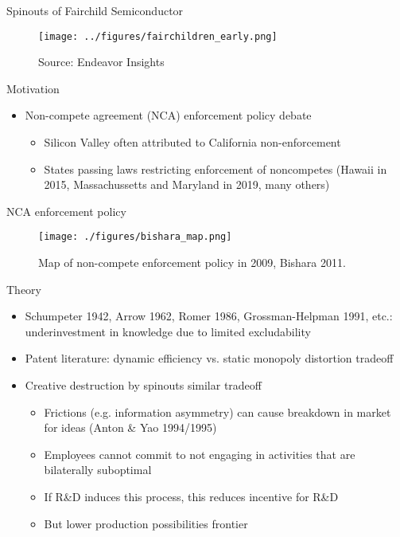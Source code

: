 \documentclass[english,usenames,dvipsnames]{beamer}
\begin{document}
\begin{frame}{Spinouts of Fairchild Semiconductor}
\begin{figure}
	\texttt{[image: ../figures/fairchildren\_early.png]}
	\caption{Source: Endeavor Insights}
\end{figure}
\end{frame}

\begin{frame}{Motivation}
\begin{itemize}
	\item Non-compete agreement (NCA) enforcement policy debate
	\begin{itemize}
		\item Silicon Valley often attributed to California non-enforcement
		\item States passing laws restricting enforcement of noncompetes (Hawaii in 2015, Massachussetts and Maryland in 2019, many others)
	\end{itemize}
\end{itemize}
\end{frame}


\begin{frame}{NCA enforcement policy}
\begin{figure}
	\texttt{[image: ./figures/bishara\_map.png]}
	\caption{Map of non-compete enforcement policy in 2009, Bishara 2011.}
\end{figure}
\end{frame}


\begin{frame}{Theory}
\label{theory_big_picture}
\begin{itemize}
	\item Schumpeter 1942, Arrow 1962, Romer 1986, Grossman-Helpman 1991, etc.: \alert{underinvestment} in knowledge due to \alert{limited excludability}
	\item Patent literature: dynamic efficiency vs. static monopoly distortion tradeoff
	\item Creative destruction by spinouts similar tradeoff
	\begin{itemize}
		\item Frictions (e.g. information asymmetry) can cause breakdown in market for ideas (Anton \& Yao 1994/1995)
		\item Employees cannot commit to not engaging in activities that are bilaterally suboptimal
		\item If R\&D induces this process, this reduces incentive for R\&D
		\item But lower production possibilities frontier
	\end{itemize}
\end{itemize}
\end{frame}
\end{document}
